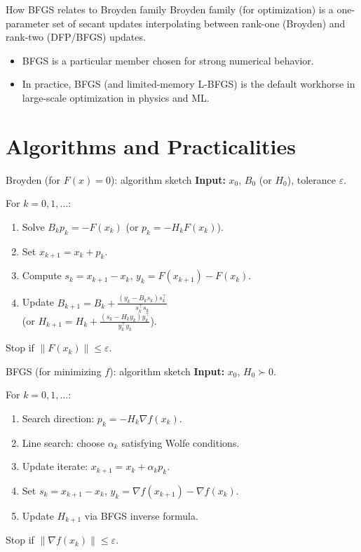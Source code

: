 \documentclass[aspectratio=169]{beamer}
\begin{document}
\begin{frame}{How BFGS relates to Broyden family}
Broyden family (for optimization) is a one-parameter set of secant updates
interpolating between rank-one (Broyden) and rank-two (DFP/BFGS) updates.

\begin{itemize}
\item BFGS is a particular member chosen for strong numerical behavior.
\item In practice, BFGS (and limited-memory L-BFGS) is the default workhorse
in large-scale optimization in physics and ML.
\end{itemize}
\end{frame}

\section{Algorithms and Practicalities}

\begin{frame}{Broyden (for $F(x)=0$): algorithm sketch}
\textbf{Input:} $x_0$, $B_0$ (or $H_0$), tolerance $\varepsilon$.

For $k=0,1,\dots$:
\begin{enumerate}
\item Solve $B_k p_k=-F(x_k)$ (or $p_k=-H_k F(x_k)$).
\item Set $x_{k+1}=x_k+p_k$.
\item Compute $s_k=x_{k+1}-x_k$, $y_k=F(x_{k+1})-F(x_k)$.
\item Update $B_{k+1}=B_k+\frac{(y_k-B_k s_k)s_k^\top}{s_k^\top s_k}$ \\
(or $H_{k+1}=H_k+\frac{(s_k-H_k y_k)y_k^\top}{y_k^\top y_k}$).
\end{enumerate}
Stop if $\|F(x_k)\|\le\varepsilon$.
\end{frame}

\begin{frame}{BFGS (for minimizing $f$): algorithm sketch}
\textbf{Input:} $x_0$, $H_0\succ 0$.

For $k=0,1,\dots$:
\begin{enumerate}
\item Search direction: $p_k=-H_k \nabla f(x_k)$.
\item Line search: choose $\alpha_k$ satisfying Wolfe conditions.
\item Update iterate: $x_{k+1}=x_k+\alpha_k p_k$.
\item Set $s_k=x_{k+1}-x_k$, $y_k=\nabla f(x_{k+1})-\nabla f(x_k)$.
\item Update $H_{k+1}$ via BFGS inverse formula.
\end{enumerate}
Stop if $\|\nabla f(x_k)\|\le\varepsilon$.
\end{frame}
\end{document}
